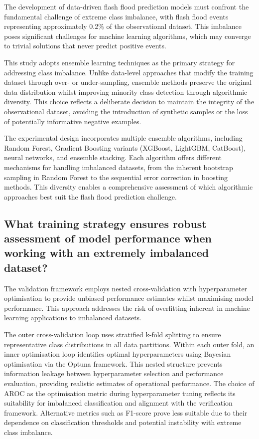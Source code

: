 The development of data-driven flash flood prediction models must confront the fundamental challenge of extreme class imbalance, with flash flood events representing approximately 0.2\% of the observational dataset. This imbalance poses significant challenges for machine learning algorithms, which may converge to trivial solutions that never predict positive events.

This study adopts ensemble learning techniques as the primary strategy for addressing class imbalance. Unlike data-level approaches that modify the training dataset through over- or under-sampling, ensemble methods preserve the original data distribution whilst improving minority class detection through algorithmic diversity. This choice reflects a deliberate decision to maintain the integrity of the observational dataset, avoiding the introduction of synthetic samples or the loss of potentially informative negative examples.

The experimental design incorporates multiple ensemble algorithms, including Random Forest, Gradient Boosting variants (XGBoost, LightGBM, CatBoost), neural networks, and ensemble stacking. Each algorithm offers different mechanisms for handling imbalanced datasets, from the inherent bootstrap sampling in Random Forest to the sequential error correction in boosting methods. This diversity enables a comprehensive assessment of which algorithmic approaches best suit the flash flood prediction challenge.


\subsection{What training strategy ensures robust assessment of model performance when working with an extremely imbalanced dataset?}

The validation framework employs nested cross-validation with hyperparameter optimisation to provide unbiased performance estimates whilst maximising model performance. This approach addresses the risk of overfitting inherent in machine learning applications to imbalanced datasets.

The outer cross-validation loop uses stratified k-fold splitting to ensure representative class distributions in all data partitions. Within each outer fold, an inner optimisation loop identifies optimal hyperparameters using Bayesian optimisation via the Optuna framework. This nested structure prevents information leakage between hyperparameter selection and performance evaluation, providing realistic estimates of operational performance.
The choice of AROC as the optimisation metric during hyperparameter tuning reflects its suitability for imbalanced classification and alignment with the verification framework. Alternative metrics such as F1-score prove less suitable due to their dependence on classification thresholds and potential instability with extreme class imbalance.


